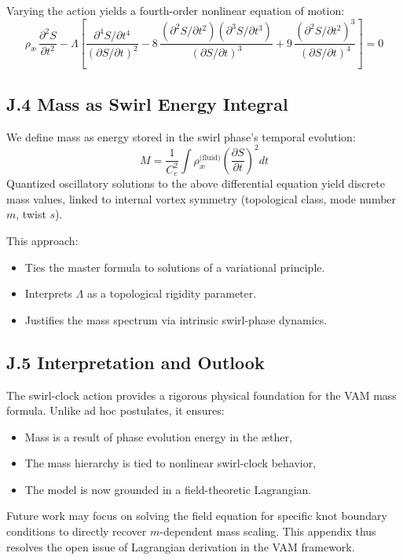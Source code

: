 Varying the action yields a fourth-order nonlinear equation of motion:
\[
\rho_{\text{\ae}} \, \frac{\partial^2 S}{\partial t^2}
- \Lambda \left[
\frac{\partial^4 S / \partial t^4}{\left(\partial S / \partial t\right)^2}
- 8 \, \frac{ \left( \partial^2 S / \partial t^2 \right) \left( \partial^3 S / \partial t^3 \right) }{ \left(\partial S / \partial t\right)^3 }
+ 9 \, \frac{ \left( \partial^2 S / \partial t^2 \right)^3 }{ \left(\partial S / \partial t\right)^4 }
\right] = 0
\]

\subsection*{J.4 Mass as Swirl Energy Integral}

We define mass as energy stored in the swirl phase's temporal evolution:
\[
M = \frac{1}{C_e^2} \int \rho_{\text{\ae}}^{\text{(fluid)}} \left( \frac{\partial S}{\partial t} \right)^2 dt
\]
Quantized oscillatory solutions to the above differential equation yield discrete mass values, linked to internal vortex symmetry (topological class, mode number $m$, twist $s$).

This approach:
\begin{itemize}
    \item Ties the master formula to solutions of a variational principle.
    \item Interprets $\Lambda$ as a topological rigidity parameter.
    \item Justifies the mass spectrum via intrinsic swirl-phase dynamics.
\end{itemize}

\subsection*{J.5 Interpretation and Outlook}

The swirl-clock action provides a rigorous physical foundation for the VAM mass formula. Unlike ad hoc postulates, it ensures:
\begin{itemize}
    \item Mass is a result of phase evolution energy in the æther,
    \item The mass hierarchy is tied to nonlinear swirl-clock behavior,
    \item The model is now grounded in a field-theoretic Lagrangian.
\end{itemize}

Future work may focus on solving the field equation for specific knot boundary conditions to directly recover $m$-dependent mass scaling. This appendix thus resolves the open issue of Lagrangian derivation in the VAM framework.